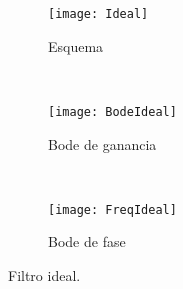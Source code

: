 %
\begin{figure}[h]
    \centering
    \begin{subfigure}[t]{.49\textwidth}
        \texttt{[image: Ideal]}
        \caption{Esquema}
        \label{subfig:filtroideal_diagrama}
    \end{subfigure}
    ~ %
    \begin{subfigure}[t]{.49\textwidth}
        \texttt{[image: BodeIdeal]}
        \caption{Bode de ganancia}
        \label{subfig:filtroideal_amplitud}
    \end{subfigure}
    ~ %
    \begin{subfigure}[t]{.49\textwidth}
        \texttt{[image: FreqIdeal]}
        \caption{Bode de fase}
        \label{subfig:filtroideal_frecuencia}
    \end{subfigure}
    \caption{Filtro ideal.}\label{fig:filtroideal}
\end{figure}

